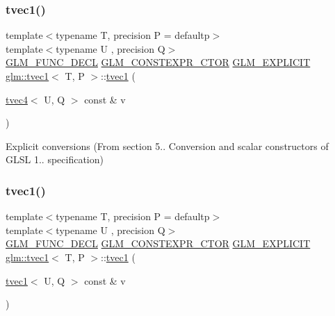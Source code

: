 \subsubsection{\texorpdfstring{tvec1()}{tvec1()}\hspace{0.1cm}{\footnotesize\ttfamily [8/14]}}
{\footnotesize\ttfamily template$<$typename T, precision P = defaultp$>$ \\
template$<$typename U , precision Q$>$ \\
\mbox{\hyperlink{setup_8hpp_ab2d052de21a70539923e9bcbf6e83a51}{G\+L\+M\+\_\+\+F\+U\+N\+C\+\_\+\+D\+E\+CL}} \mbox{\hyperlink{setup_8hpp_ad34178a09666081abdb573c14d1f4a5a}{G\+L\+M\+\_\+\+C\+O\+N\+S\+T\+E\+X\+P\+R\+\_\+\+C\+T\+OR}} \mbox{\hyperlink{setup_8hpp_a6c74f5a5e7b134ab69023ff9a30d4d5d}{G\+L\+M\+\_\+\+E\+X\+P\+L\+I\+C\+IT}} \mbox{\hyperlink{structglm_1_1tvec1}{glm\+::tvec1}}$<$ T, P $>$\+::\mbox{\hyperlink{structglm_1_1tvec1}{tvec1}} (\begin{DoxyParamCaption}\item[{\mbox{\hyperlink{structglm_1_1tvec4}{tvec4}}$<$ U, Q $>$ const \&}]{v }\end{DoxyParamCaption})}



Explicit conversions (From section 5.. Conversion and scalar constructors of G\+L\+SL 1.. specification) 

\mbox{\label{structglm_1_1tvec1_a9122f5419d51e798f0a249e8f0b2433a}} 
\subsubsection{\texorpdfstring{tvec1()}{tvec1()}\hspace{0.1cm}{\footnotesize\ttfamily [9/14]}}
{\footnotesize\ttfamily template$<$typename T, precision P = defaultp$>$ \\
template$<$typename U , precision Q$>$ \\
\mbox{\hyperlink{setup_8hpp_ab2d052de21a70539923e9bcbf6e83a51}{G\+L\+M\+\_\+\+F\+U\+N\+C\+\_\+\+D\+E\+CL}} \mbox{\hyperlink{setup_8hpp_ad34178a09666081abdb573c14d1f4a5a}{G\+L\+M\+\_\+\+C\+O\+N\+S\+T\+E\+X\+P\+R\+\_\+\+C\+T\+OR}} \mbox{\hyperlink{setup_8hpp_a6c74f5a5e7b134ab69023ff9a30d4d5d}{G\+L\+M\+\_\+\+E\+X\+P\+L\+I\+C\+IT}} \mbox{\hyperlink{structglm_1_1tvec1}{glm\+::tvec1}}$<$ T, P $>$\+::\mbox{\hyperlink{structglm_1_1tvec1}{tvec1}} (\begin{DoxyParamCaption}\item[{\mbox{\hyperlink{structglm_1_1tvec1}{tvec1}}$<$ U, Q $>$ const \&}]{v }\end{DoxyParamCaption})}




